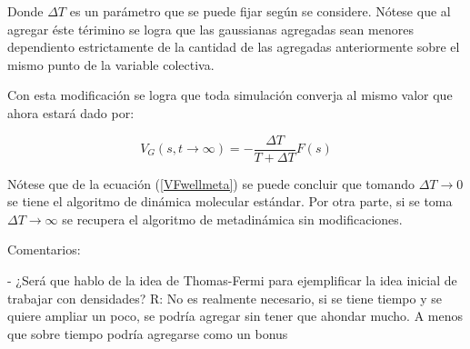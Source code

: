 \documentclass [11pt]{article}
\begin{document}
 Donde $\Delta T$ es un parámetro que se puede fijar según se considere. Nótese que al agregar éste térimino se logra que las gaussianas agregadas sean menores dependiento estrictamente de la cantidad de las agregadas anteriormente sobre el mismo punto de la variable colectiva. 
 
 Con esta modificación se logra que toda simulación converja al mismo valor que ahora estará dado por:
 
 \begin{equation}\label{VFwellmeta}
     V_G(s,t\rightarrow\infty)=-\frac{\Delta T}{T+\Delta T} F(s)
 \end{equation}

Nótese que de la ecuación (\ref{VFwellmeta}) se puede concluir que tomando $\Delta T\rightarrow0$ se tiene el algoritmo de dinámica molecular estándar. Por otra parte, si se toma $\Delta T\rightarrow\infty$ se recupera el algoritmo de metadinámica sin modificaciones.
















\vspace{20 cm}

Comentarios:

- ¿Será que hablo de la idea de Thomas-Fermi para ejemplificar la idea inicial de trabajar con densidades? R: No es realmente necesario, si se tiene tiempo y se quiere ampliar un poco, se podría agregar sin tener que ahondar mucho. A menos que sobre tiempo podría agregarse como un bonus





















 

























\vspace{20 cm}
\nocite{*}


\end{document}
